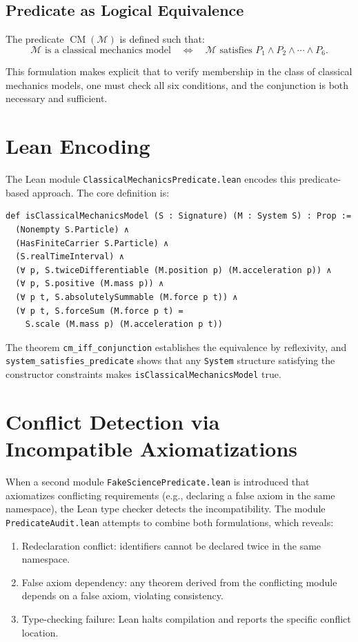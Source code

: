 \documentclass[11pt]{article}
\begin{document}
\subsection{Predicate as Logical Equivalence}

The predicate $\operatorname{CM}(\mathcal{M})$ is defined such that:
\[
  \mathcal{M} \text{ is a classical mechanics model} \quad\Longleftrightarrow\quad
  \mathcal{M} \text{ satisfies } P_1 \land P_2 \land \cdots \land P_6.
\]

This formulation makes explicit that to verify membership in the class of
classical mechanics models, one must check all six conditions, and the
conjunction is both necessary and sufficient.

\section{Lean Encoding}

The Lean module \texttt{ClassicalMechanicsPredicate.lean} encodes this
predicate-based approach. The core definition is:

\begin{verbatim}
def isClassicalMechanicsModel (S : Signature) (M : System S) : Prop :=
  (Nonempty S.Particle) ∧
  (HasFiniteCarrier S.Particle) ∧
  (S.realTimeInterval) ∧
  (∀ p, S.twiceDifferentiable (M.position p) (M.acceleration p)) ∧
  (∀ p, S.positive (M.mass p)) ∧
  (∀ p t, S.absolutelySummable (M.force p t)) ∧
  (∀ p t, S.forceSum (M.force p t) =
    S.scale (M.mass p) (M.acceleration p t))
\end{verbatim}

The theorem \texttt{cm\_iff\_conjunction} establishes the equivalence by
reflexivity, and \texttt{system\_satisfies\_predicate} shows that any
\texttt{System} structure satisfying the constructor constraints makes
\texttt{isClassicalMechanicsModel} true.

\section{Conflict Detection via Incompatible Axiomatizations}

When a second module \texttt{FakeSciencePredicate.lean} is introduced that
axiomatizes conflicting requirements (e.g., declaring a false axiom in the
same namespace), the Lean type checker detects the incompatibility. The module
\texttt{PredicateAudit.lean} attempts to combine both formulations, which
reveals:

\begin{enumerate}
  \item Redeclaration conflict: identifiers cannot be declared twice in the
    same namespace.
  \item False axiom dependency: any theorem derived from the conflicting module
    depends on a false axiom, violating consistency.
  \item Type-checking failure: Lean halts compilation and reports the specific
    conflict location.
\end{enumerate}
\end{document}
